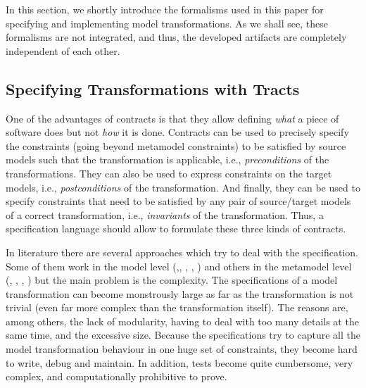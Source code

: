 In this section, we shortly introduce the formalisms used in this paper for specifying and implementing model transformations. As we shall see, these formalisms are not integrated, and thus, the developed artifacts are completely independent of each other.

\subsection{Specifying Transformations with Tracts}

One of the advantages of contracts is that they allow defining \emph{what} a piece of software does but not \emph{how} it is done. Contracts can be used to precisely specify the constraints (going beyond metamodel constraints) to be
satisfied by source models such that the transformation is applicable, i.e.,
\emph{preconditions} of the transformations. They can also be used to
express constraints on the target models, i.e., \emph{postconditions} of the
transformation. And finally, they can be used to specify constraints that need to
be satisfied by any pair of source/target models of a correct transformation, i.e., \emph{invariants} of the transformation.
Thus, a specification language should allow to formulate these three kinds of
contracts.

In literature there are several approaches which try to deal with the specification. Some of them work in the model level (\cite{Kolovos06},\cite{Lin04modelcomparison:}, \cite{Lin2005}, \cite{Garcia-Dominguez11}, \cite{Mottu2008}) and others in the metamodel level (\cite{BaloghBCGHMPPRVa10}, \cite{Guerra12}, \cite{Baudry06}, \cite{Anastasakis07}) but the main problem is the complexity. The specifications of a model
transformation can become monstrously large as far as the transformation is not
trivial (even far more complex than the transformation itself). The reasons
are, among others, the lack of modularity, having to deal with too many details
at the same time, and the excessive size. Because the specifications try to
capture all the model transformation behaviour in one huge set of constraints,
they become hard to write, debug and maintain. In addition, tests become quite
cumbersome, very complex, and computationally prohibitive to prove.

